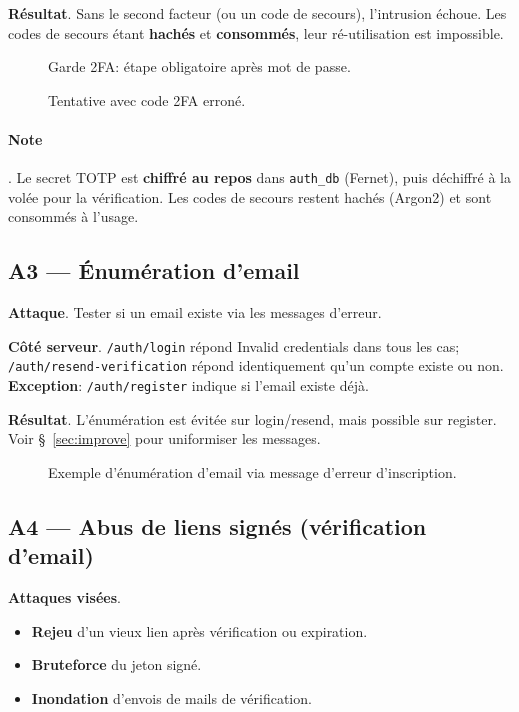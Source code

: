 \textbf{Résultat}. Sans le second facteur (ou un code de secours), l'intrusion échoue. Les codes de secours étant \textbf{hachés} et \textbf{consommés}, leur ré-utilisation est impossible.

\begin{figure}[h]
  \centering
  \caption{Garde 2FA: étape obligatoire après mot de passe.}
\end{figure}

\begin{figure}[h]
  \centering
  \caption{Tentative avec code 2FA erroné.}
\end{figure}

\paragraph{Note}. Le secret TOTP est \textbf{chiffré au repos} dans \texttt{auth\_db} (Fernet), puis déchiffré à la volée pour la vérification. Les codes de secours restent hachés (Argon2) et sont consommés à l'usage.

\subsection*{A3 — Énumération d'email}
\textbf{Attaque}. Tester si un email existe via les messages d'erreur.

\textbf{Côté serveur}. \texttt{/auth/login} répond \og Invalid credentials \fg{} dans tous les cas; \texttt{/auth/resend-verification} répond identiquement qu'un compte existe ou non. \textbf{Exception}: \texttt{/auth/register} indique si l'email existe déjà.

\textbf{Résultat}. L'énumération est évitée sur login/resend, mais possible sur register. Voir \S~\ref{sec:improve} pour uniformiser les messages.

\begin{figure}[h]
  \centering
  \caption{Exemple d'énumération d'email via message d'erreur d'inscription.}
\end{figure}

\subsection*{A4 — Abus de liens signés (vérification d'email)}
\textbf{Attaques visées}.
\begin{itemize}
  \item \textbf{Rejeu} d'un vieux lien après vérification ou expiration.
  \item \textbf{Bruteforce} du jeton signé.
  \item \textbf{Inondation} d'envois de mails de vérification.
\end{itemize}

